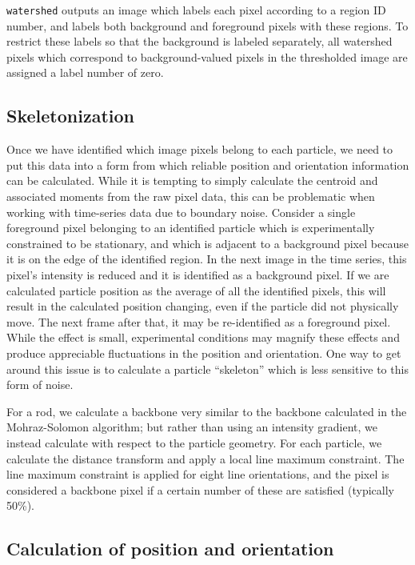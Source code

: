 \texttt{watershed} outputs an image which labels each pixel according to a region ID number, and labels both background
and foreground pixels with these regions. To restrict these labels so that the background is labeled separately, all 
watershed pixels which correspond to background-valued pixels in the thresholded image are assigned a label number of zero.

\subsection{Skeletonization}

Once we have identified which image pixels belong to each particle, we need to put this data into a form from
which reliable position and orientation information can be calculated.  While it is tempting to simply
calculate the centroid and associated moments from the raw pixel data, this can be problematic when working with
time-series data due to boundary noise. Consider a single foreground pixel belonging to 
an identified particle which is experimentally
constrained to be stationary, and which is adjacent to a background pixel because it is on the edge of the identified 
region. In the next image in the time series, this pixel's intensity is reduced and it is identified as a background
pixel.  If we are calculated particle position as the average of all the identified pixels, this will result in 
the calculated position changing, even if the particle did not physically move. The next frame after that, it 
may be re-identified as a foreground pixel.  While the effect is small, experimental conditions may magnify
these effects and produce appreciable fluctuations in the position and orientation. One way to get around this issue
is to calculate a particle ``skeleton'' which is less sensitive to this form of noise.

For a rod, we calculate a backbone very similar to the backbone calculated in the Mohraz-Solomon algorithm; but rather 
than using an intensity gradient, we instead calculate with respect to the particle geometry. For each particle, 
we calculate the distance transform and apply a local line maximum constraint. The line maximum constraint is applied
for eight line orientations, and the pixel is considered a backbone pixel if a certain number of these are
satisfied (typically 50\%).

\subsection{Calculation of position and orientation}

